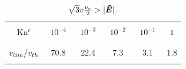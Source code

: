 \begin{table}
\begin{center}
  \begin{tabular}{c|ccccc}
    \hline\hline\\
    Kn$^e$ & $\,\,10^{-4}\,\,$ & $\,\,10^{-3}\,\,$ & $\,\,10^{-2}\,\,$ & $\,\,10^{-1}\,\,$ & $\,\,1\,\,$ \\\\
    \hline\\
    $v_{lim} / v_{th}$ & 70.8 & 22.4 & 7.3 & 3.1 & 1.8\\\\
    \hline\hline
  \end{tabular}
  \caption{
  $\sqrt{3}v\frac{\nu_{e}}{2} > |\boldsymbol{\tilde{E}}|$.
  }
\label{tab:vlim}
\end{center}
\end{table}

